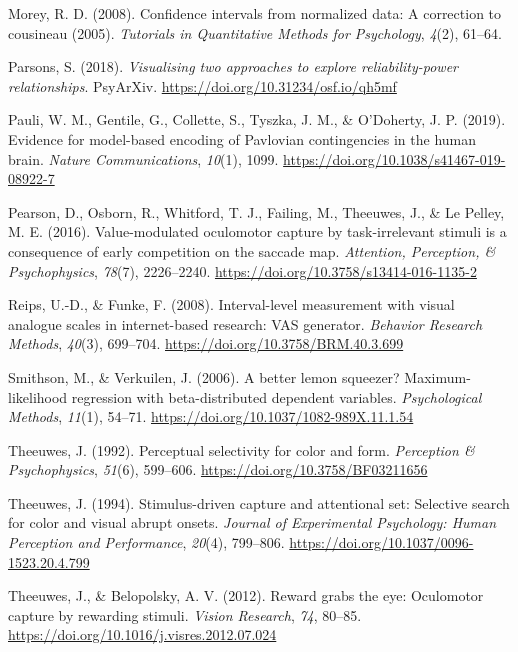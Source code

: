 \documentclass[
  jou,
  floatsintext,
  longtable,
  nolmodern,
  notxfonts,
  notimes,
  colorlinks=true,linkcolor=blue,citecolor=blue,urlcolor=blue]{apa7}
\newlength{\cslhangindent}
\newenvironment{CSLReferences}[2] %
 {\begin{list}{}{%
  \setlength{\itemindent}{0pt}
  \setlength{\leftmargin}{0pt}
  \setlength{\parsep}{0pt}
  \ifodd #1
   \setlength{\leftmargin}{\cslhangindent}
   \setlength{\itemindent}{-1\cslhangindent}
  \fi
  \setlength{\itemsep}{#2\baselineskip}}}
 {\end{list}}
\begin{document}
\begin{CSLReferences}{1}{0}
Morey, R. D. (2008). Confidence intervals from normalized data: A
correction to cousineau (2005). \emph{Tutorials in Quantitative Methods
for Psychology}, \emph{4}(2), 61--64.

Parsons, S. (2018). \emph{Visualising two approaches to explore
reliability-power relationships}. PsyArXiv.
\url{https://doi.org/10.31234/osf.io/qh5mf}

Pauli, W. M., Gentile, G., Collette, S., Tyszka, J. M., \& O'Doherty, J.
P. (2019). Evidence for model-based encoding of Pavlovian contingencies
in the human brain. \emph{Nature Communications}, \emph{10}(1), 1099.
\url{https://doi.org/10.1038/s41467-019-08922-7}

Pearson, D., Osborn, R., Whitford, T. J., Failing, M., Theeuwes, J., \&
Le Pelley, M. E. (2016). Value-modulated oculomotor capture by
task-irrelevant stimuli is a consequence of early competition on the
saccade map. \emph{Attention, Perception, \& Psychophysics},
\emph{78}(7), 2226--2240.
\url{https://doi.org/10.3758/s13414-016-1135-2}

Reips, U.-D., \& Funke, F. (2008). Interval-level measurement with
visual analogue scales in internet-based research: VAS generator.
\emph{Behavior Research Methods}, \emph{40}(3), 699--704.
\url{https://doi.org/10.3758/BRM.40.3.699}

Smithson, M., \& Verkuilen, J. (2006). A better lemon squeezer?
Maximum-likelihood regression with beta-distributed dependent variables.
\emph{Psychological Methods}, \emph{11}(1), 54--71.
\url{https://doi.org/10.1037/1082-989X.11.1.54}

Theeuwes, J. (1992). Perceptual selectivity for color and form.
\emph{Perception \& Psychophysics}, \emph{51}(6), 599--606.
\url{https://doi.org/10.3758/BF03211656}

Theeuwes, J. (1994). Stimulus-driven capture and attentional set:
Selective search for color and visual abrupt onsets. \emph{Journal of
Experimental Psychology: Human Perception and Performance},
\emph{20}(4), 799--806. \url{https://doi.org/10.1037/0096-1523.20.4.799}

Theeuwes, J., \& Belopolsky, A. V. (2012). Reward grabs the eye:
Oculomotor capture by rewarding stimuli. \emph{Vision Research},
\emph{74}, 80--85. \url{https://doi.org/10.1016/j.visres.2012.07.024}


\end{CSLReferences}
\end{document}
